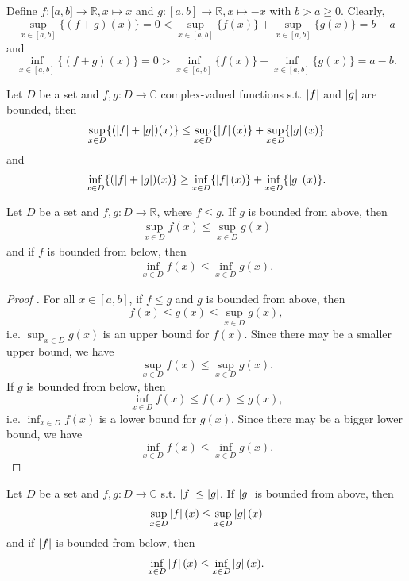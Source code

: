 \begin{exmp}
	Define $f: \mathbb [a, b]\to\mathbb R, x\mapsto x$ and $g: [a, b]\to\mathbb R, x\mapsto -x$ with $b > a\geq 0$. Clearly, $$\sup_{x\in [a, b]}\{(f+g)(x)\} = 0 < \sup_{x\in [a, b]}\{f(x)\} + \sup_{x\in [a, b]}\{g(x)\} = b - a$$ and $$\inf_{x\in [a, b]}\{(f + g)(x)\} = 0 > \inf_{x\in [a, b]}\{f(x)\} + \inf_{x\in [a, b]}\{g(x)\} = a - b.$$
\end{exmp}

\begin{corollary}
	Let $D$ be a set and $f, g: D\to \mathbb C$ complex-valued functions s.t. $\left\vert f \right\vert$ and $\left\vert g \right\vert$ are bounded, then 
	\begin{align}
		\sup_{x\in D}\{(\left\vert f \right\vert + \left\vert g \right\vert)(x)\} \leq \sup_{x\in D}\{\left\vert f \right\vert(x)\} + \sup_{x\in D}\{\left\vert g \right\vert(x)\}
	\end{align}
	and
	\begin{align}
		\inf_{x\in D}\{(\left\vert f \right\vert+\left\vert g \right\vert)(x)\} \geq \inf_{x\in D}\{\left\vert f \right\vert(x)\} + \inf_{x\in D}\{\left\vert g \right\vert(x)\}.
	\end{align}
\end{corollary}

\begin{theorem}\label{thrm:sup_inequality_2}
	Let $D$ be a set and $f, g: D\to\mathbb R$, where $f \leq g$. If $g$ is bounded from above, then 
	\begin{align}
		\sup_{x\in D}f(x)\leq \sup_{x\in D}g(x)
	\end{align}
	and if $f$ is bounded from below, then 
	\begin{align}
		\inf_{x\in D}f(x) \leq \inf_{x\in D}g(x).
	\end{align}
\end{theorem}

\begin{proof}[Proof \cite{src:supremum_and_infimum}]
	For all $x\in[a, b]$, if $f\leq g$ and $g$ is bounded from above, then
	$$f(x)\leq g(x)\leq \sup_{x\in D}g(x),$$
	i.e. $\sup_{x\in D}g(x)$ is an upper bound for $f(x)$. Since there may be a smaller upper bound, we have
	$$\sup_{x\in D}f(x) \leq \sup_{x\in D}g(x).$$
	If $g$ is bounded from below, then 
	$$\inf_{x\in D}f(x) \leq f(x) \leq g(x),$$
	i.e. $\inf_{x\in D}f(x)$ is a lower bound for $g(x)$. Since there may be a bigger lower bound, we have
	$$\inf_{x\in D}f(x)\leq \inf_{x\in D}g(x).$$	
\end{proof}

\begin{corollary}
	Let $D$ be a set and $f, g: D\to\mathbb C$ s.t. $\left\vert f \right\vert\leq\left\vert g \right\vert$. If $\left\vert g \right\vert$ is bounded from above, then 
	\begin{align}
		\sup_{x\in D}\left\vert f \right\vert(x) \leq \sup_{x\in D}\left\vert g \right\vert(x)
	\end{align}
	and if $\left\vert f \right\vert$ is bounded from below, then 
	\begin{align}
		\inf_{x\in D}\left\vert f \right\vert(x) \leq \inf_{x\in D}\left\vert g \right\vert(x).
	\end{align}
\end{corollary}